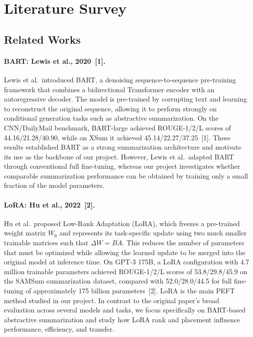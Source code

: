 \documentclass[11pt, letterpaper]{article}
\begin{document}
\section{Literature Survey}


\subsection{Related Works}

\paragraph{BART: Lewis et al., 2020~[1].}
Lewis et al.\ introduced BART, a denoising sequence-to-sequence pre-training
framework that combines a bidirectional Transformer encoder with an
autoregressive decoder. The model is pre-trained by corrupting text and
learning to reconstruct the original sequence, allowing it to perform strongly
on conditional generation tasks such as abstractive summarization. On the
CNN/DailyMail benchmark, BART-large achieved ROUGE-1/2/L scores of
44.16/21.28/40.90, while on XSum it achieved 45.14/22.27/37.25~[1].
These results established BART as a strong summarization architecture and
motivate its use as the backbone of our project. However, Lewis et al.\
adapted BART through conventional full fine-tuning, whereas our project
investigates whether comparable summarization performance can be obtained by
training only a small fraction of the model parameters.

\paragraph{LoRA: Hu et al., 2022~[2].}
Hu et al.\ proposed Low-Rank Adaptation (LoRA), which freezes a pre-trained
weight matrix $W_0$ and represents its task-specific update using two much
smaller trainable matrices such that $\Delta W = BA$. This reduces the number
of parameters that must be optimized while allowing the learned update to be
merged into the original model at inference time. On GPT-3 175B, a LoRA
configuration with 4.7 million trainable parameters achieved
ROUGE-1/2/L scores of 53.8/29.8/45.9 on the SAMSum summarization dataset,
compared with 52.0/28.0/44.5 for full fine-tuning of approximately
175 billion parameters~[2]. LoRA is the main PEFT method studied in our
project. In contrast to the original paper's broad evaluation across several
models and tasks, we focus specifically on BART-based abstractive
summarization and study how LoRA rank and placement influence performance,
efficiency, and transfer.
\end{document}
